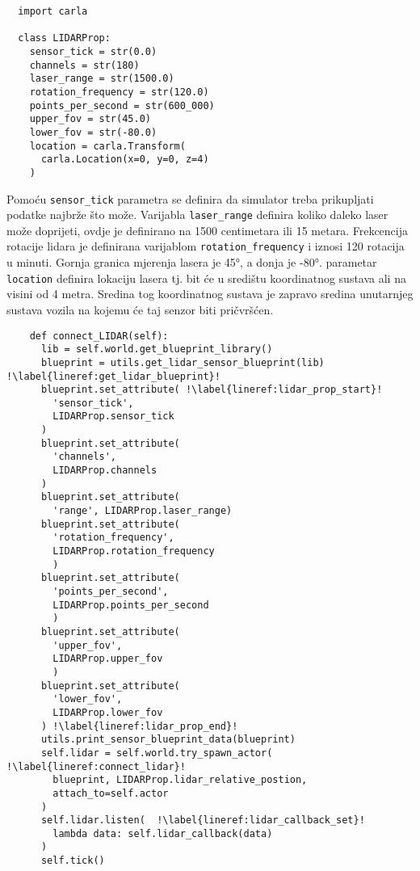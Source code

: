 \begin{listing}[h!]
  \begin{verbatim}
  import carla

  class LIDARProp:
    sensor_tick = str(0.0)
    channels = str(180)
    laser_range = str(1500.0)
    rotation_frequency = str(120.0)
    points_per_second = str(600_000)
    upper_fov = str(45.0)
    lower_fov = str(-80.0)
    location = carla.Transform(
      carla.Location(x=0, y=0, z=4)
    )
  \end{verbatim}
  \caption{LIDAR atributi}
  \label{coderef:lidar_props}
\end{listing}

Pomoću \texttt{sensor_tick} parametra se definira da simulator treba  prikupljati podatke najbrže što može. Varijabla \texttt{laser_range} definira koliko daleko laser može doprijeti, ovdje je definirano na 1500 centimetara ili 15 metara. Frekcencija rotacije lidara je definirana varijablom \texttt{rotation_frequency} i iznosi 120 rotacija u minuti. Gornja granica mjerenja lasera je 45°, a donja je -80°. parametar \texttt{location} definira lokaciju lasera tj. bit će u središtu koordinatnog sustava ali na visini od 4 metra. Sredina tog koordinatnog sustava je zapravo sredina unutarnjeg sustava vozila na kojemu će taj senzor biti pričvršćen.

\pagebreak
\begin{listing}[h!]
  \begin{verbatim}
    def connect_LIDAR(self):
      lib = self.world.get_blueprint_library()
      blueprint = utils.get_lidar_sensor_blueprint(lib) !\label{lineref:get_lidar_blueprint}!
      blueprint.set_attribute( !\label{lineref:lidar_prop_start}!
        'sensor_tick',
        LIDARProp.sensor_tick
      )
      blueprint.set_attribute(
        'channels',
        LIDARProp.channels
      )
      blueprint.set_attribute(
        'range', LIDARProp.laser_range)
      blueprint.set_attribute(
        'rotation_frequency',
        LIDARProp.rotation_frequency
        )
      blueprint.set_attribute(
        'points_per_second',
        LIDARProp.points_per_second
        )
      blueprint.set_attribute(
        'upper_fov',
        LIDARProp.upper_fov
        )
      blueprint.set_attribute(
        'lower_fov',
        LIDARProp.lower_fov
      ) !\label{lineref:lidar_prop_end}!
      utils.print_sensor_blueprint_data(blueprint)
      self.lidar = self.world.try_spawn_actor(  !\label{lineref:connect_lidar}!
        blueprint, LIDARProp.lidar_relative_postion,
        attach_to=self.actor
      )
      self.lidar.listen(  !\label{lineref:lidar_callback_set}!
        lambda data: self.lidar_callback(data)
      )
      self.tick()
  \end{verbatim}
  \caption{Stvaranje LIDAR senzora}
  \label{coderef:lidar_find_spawn}
\end{listing}

